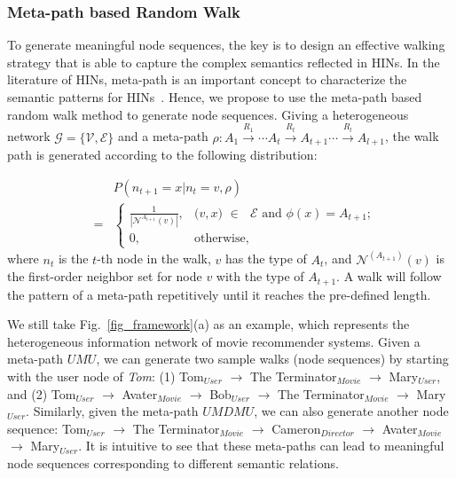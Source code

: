 
\subsubsection{Meta-path based Random Walk}
To generate meaningful node sequences, the key is to design an effective walking strategy that is able to capture the complex semantics reflected in HINs. In the literature of HINs, meta-path is an important concept to characterize the semantic patterns for HINs~\cite{sun2011pathsim}.
Hence, we propose to use the meta-path based random walk method to generate node sequences. Giving a heterogeneous network $\mathcal{G} = \{\mathcal{V}, \mathcal{E}\}$ and a meta-path $\rho : A_1 \xrightarrow{R_1} \cdots A_t \xrightarrow{R_t} A_{t+1} \cdots \xrightarrow{R_l} A_{l+1}$, the walk path is generated according to the following distribution:

\begin{eqnarray}\label{eq-rw}
&&P({n_{t+1}=x |n_{t}=v, \rho})\\
&=&\begin{cases}
\frac{1}{|\mathcal{N}^{A_{t+1}}(v)|}, &\text{($v, x$) $\in$ $\mathcal{E}$ and $\phi(x) = A_{t+1}$};\nonumber\\
0,& \text{otherwise},
\end{cases}
\end{eqnarray}
where $n_t$ is the $t$-th node in the walk, $v$ has the type of $A_t$, and $\mathcal{N}^{(A_{t+1})}(v)$ is the first-order neighbor set for node $v$ with the type of $A_{t+1}$. A walk will follow the pattern of a meta-path repetitively until it reaches the pre-defined length.

\begin{exmp}
We still take Fig.~\ref{fig_framework}(a) as an example, which represents the heterogeneous information network of movie recommender systems.
Given a meta-path $UMU$, we can generate two sample walks (\ie node sequences) by starting with the user node of \emph{Tom}: (1) Tom$_{User}$ $\rightarrow$ The Terminator$_{Movie}$ $\rightarrow$  Mary$_{User}$, and (2) Tom$_{User}$ $\rightarrow$  Avater$_{Movie}$ $\rightarrow$  Bob$_{User}$ $\rightarrow$  The Terminator$_{Movie}$ $\rightarrow$  Mary$_{User}$. Similarly, given the meta-path $UMDMU$, we can also generate another node sequence: Tom$_{User}$ $\rightarrow$  The Terminator$_{Movie}$ $\rightarrow$  Cameron$_{Director}$  $\rightarrow$  Avater$_{Movie}$  $\rightarrow$ Mary$_{User}$. It is intuitive to see that these meta-paths can lead to meaningful node sequences corresponding to different semantic relations.
\end{exmp}

